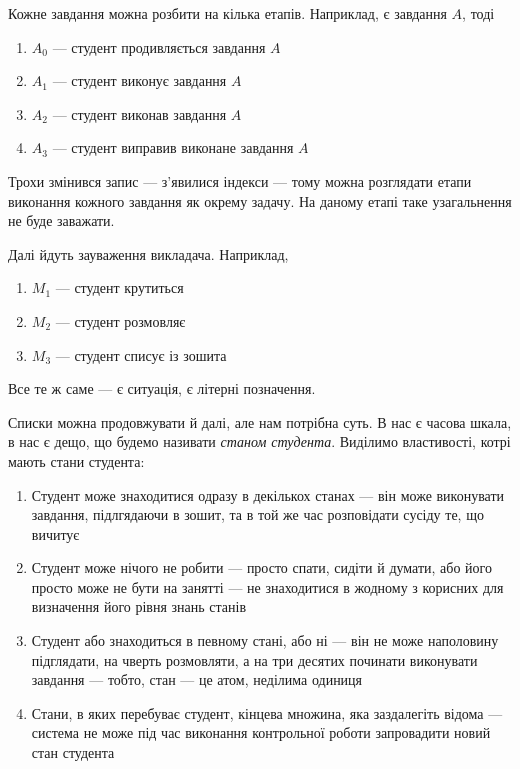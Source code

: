 Кожне завдання можна розбити на кілька етапів.
Наприклад, є завдання $A$, тоді
\begin{enumerate}
  \item
    $A_0$ --- студент продивляється завдання $A$
  \item
    $A_1$ --- студент виконує завдання $A$
  \item
    $A_2$ --- студент виконав завдання $A$
  \item
    $A_3$ --- студент виправив виконане завдання $A$
\end{enumerate}

Трохи змінився запис --- з’явилися індекси --- тому можна розглядати етапи
виконання кожного завдання як окрему задачу.
На даному етапі таке узагальнення не буде заважати.

Далі йдуть зауваження викладача. Наприклад,
\begin{enumerate}
  \item
    $M_1$ --- студент крутиться
  \item
    $M_2$ --- студент розмовляє
  \item
    $M_3$ --- студент списує із зошита
\end{enumerate}

Все те ж саме --- є ситуація, є літерні позначення.

Списки можна продовжувати й далі, але нам потрібна суть.
В нас є часова шкала, в нас є дещо, що будемо називати
\textit{станом студента}.
Виділимо властивості, котрі мають стани студента:

\begin{enumerate}
  \item 
    Студент може знаходитися одразу в декількох станах --- він може
    виконувати завдання, підлгядаючи в зошит, та в той же час розповідати
    сусіду те, що вичитує
  \item
    Студент може нічого не робити --- просто спати, сидіти й думати,
    або його просто може не бути на занятті --- не знаходитися в жодному з
    корисних для визначення його рівня знань станів
  \item
    Студент або знаходиться в певному стані, або ні ---
    він не може наполовину підглядати, на чверть розмовляти, а на три
    десятих починати виконувати завдання --- тобто, стан --- це атом,
    неділима одиниця
  \item
    Стани, в яких перебуває студент, кінцева множина, яка заздалегіть відома
    --- система не може під час виконання контрольної роботи запровадити
    новий стан студента
\end{enumerate}

